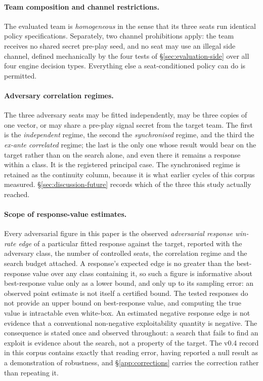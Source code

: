 \paragraph{Team composition and channel restrictions.} The evaluated team is \emph{homogeneous} in
the sense that its three seats run identical policy specifications. Separately, two channel
prohibitions apply: the team receives no shared secret pre-play seed, and no seat may use an illegal
side channel, defined mechanically by the four tests of \S\ref{sec:evaluation-side} over all four
engine decision types. Everything else a seat-conditioned policy can do is permitted.

\paragraph{Adversary correlation regimes.} The three adversary seats may be fitted independently,
may be three copies of one vector, or may share a pre-play signal secret from the target team. The
first is the \emph{independent} regime, the second the \emph{synchronised} regime, and the third the
\emph{ex-ante correlated} regime; the last is the only one whose result would bear on the target
rather than on the search alone, and even there it remains a response within a class. It is the
registered principal case. The synchronised regime is retained as the continuity column, because it
is what earlier cycles of this corpus measured. \S\ref{sec:discussion-future} records which of the
three this study actually reached.

\paragraph{Scope of response-value estimates.} Every adversarial figure in this paper is the
observed \emph{adversarial response win-rate edge} of a particular fitted response against the
target, reported with the adversary class, the number of controlled seats, the correlation regime
and the search budget attached. A response's expected edge is no greater than the best-response
value over any class containing it, so such a figure is informative about best-response value only
as a lower bound, and only up to its sampling error: an observed point estimate is not itself a
certified bound. The tested responses do not provide an upper bound on best-response value, and
computing the true value is intractable even white-box. An estimated negative response edge is not
evidence that a conventional non-negative exploitability quantity is negative. The consequence is
stated once and observed throughout: a search that fails to find an exploit is evidence about the
search, not a property of the target. The v0.4 record in this corpus contains exactly that reading
error, having reported a null result as a demonstration of robustness, and \S\ref{app:corrections}
carries the correction rather than repeating it.

